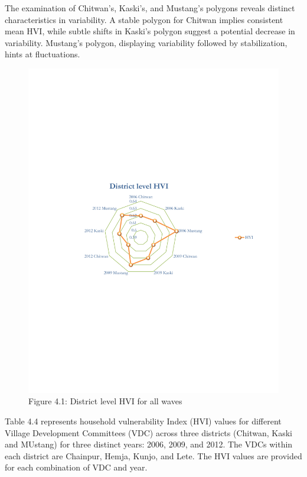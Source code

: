 \documentclass[12pt, a4paper]{article}
\begin{document}
The examination of Chitwan's, Kaski's, and Mustang's polygons reveals distinct characteristics in variability. A stable polygon for Chitwan implies consistent mean HVI, while subtle shifts in Kaski's polygon suggest a potential decrease in variability. Mustang's polygon, displaying variability followed by stabilization, hints at fluctuations.  
\begin{figure}[H]
	\vspace{-180pt} %
	\includegraphics[scale=0.8]{HVI_Summary_District_Panel1.pdf}
	\captionsetup{labelformat=empty, aboveskip=1pt}%
	\vspace{-160pt}
	\caption{Figure 4.1: District level HVI for all waves} 
	\label{fig:distictlevelhvi}
	\setlength{\abovecaptionskip}{6pt}
	\label{fig:conceptualfw}
\end{figure}

Table 4.4 represents household vulnerability Index (HVI) values for different Village Development Committees (VDC) across three districts (Chitwan, Kaski and MUstang) for three distinct years: 2006, 2009, and 2012. The VDCs within each district are Chainpur, Hemja, Kunjo, and Lete. The HVI values are provided for each combination of VDC and year.
\end{document}
